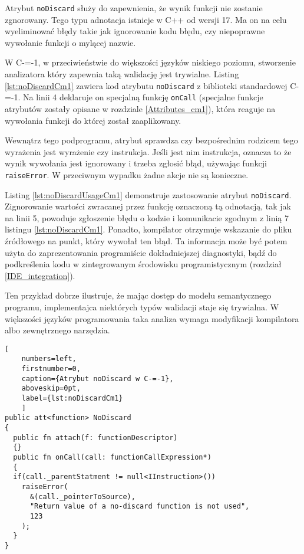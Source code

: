 Atrybut \lstinline{noDiscard} służy do zapewnienia, że wynik funkcji nie zostanie zgnorowany.
Tego typu adnotacja istnieje w C++ od wersji 17.
Ma on na celu wyeliminować błędy takie jak ignorowanie kodu błędu, czy niepoprawne wywołanie funkcji o mylącej nazwie.

W C-=-1, w przeciwieństwie do większości języków niskiego poziomu, stworzenie analizatora który zapewnia taką walidację jest trywialne.
Listing \ref{lst:noDiscardCm1} zawiera kod atrybutu \lstinline{noDiscard} z biblioteki standardowej C-=-1.
Na linii 4 deklaruje on specjalną funkcję \lstinline{onCall} (specjalne funkcje atrybutów zostały opisane w rozdziale \ref{Attributes_cm1}), która reaguje na wywołania funkcji do której został zaaplikowany.

Wewnątrz tego podprogramu, atrybut sprawdza czy bezpośrednim rodzicem tego wyrażenia jest wyrażenie czy instrukcja.
Jeśli jest nim instrukcja, oznacza to że wynik wywołania jest ignorowany i trzeba zgłosić błąd, używając funkcji \lstinline{raiseError}.
W przeciwnym wypadku żadne akcje nie są konieczne.

Listing \ref{lst:noDiscardUsageCm1} demonstruje zastosowanie atrybut \lstinline{noDiscard}.
Zignorowanie wartości zwracanej przez funkcję oznaczoną tą odnotacją, tak jak na linii 5, powoduje zgłoszenie błędu o kodzie i komunikacie zgodnym z linią 7 listingu \ref{lst:noDiscardCm1}.
Ponadto, kompilator otrzymuje wskazanie do pliku źródłowego na punkt, który wywołał ten błąd.
Ta informacja może być potem użyta do zaprezentowania programiście dokładniejszej diagnostyki, bądź do podkreślenia kodu w zintegrowanym środowisku programistycznym (rozdział \ref{IDE_integration}).

Ten przykład dobrze ilustruje, że mając dostęp do modelu semantycznego programu, implementajca niektórych typów walidacji staje się trywialna.
W większości języków programowania taka analiza wymaga modyfikacji kompilatora albo zewnętrznego narzędzia.

\begin{minipage}{\linewidth}
  
  \begin{lstlisting}[
    numbers=left,
    firstnumber=0,
    caption={Atrybut noDiscard w C-=-1},
    aboveskip=0pt,
    label={lst:noDiscardCm1}
    ]
public att<function> NoDiscard
{
  public fn attach(f: functionDescriptor)
  {}
  public fn onCall(call: functionCallExpression*)
  {
  if(call._parentStatment != null<IInstruction>())
    raiseError(
      &(call._pointerToSource), 
      "Return value of a no-discard function is not used",
      123
    );
  }
}
\end{lstlisting}
\end{minipage}


